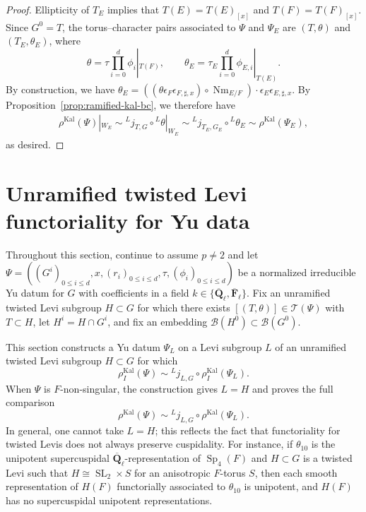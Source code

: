 \documentclass[reqno]{amsart}
\numberwithin{equation}{subsection}
\newcommand{\F}{\mathbf{F}}
\newcommand{\Q}{\mathbf{Q}}
\newcommand{\ol}[1]{\overline{#1}}
\newcommand{\ld}{{}^L}
\newcommand\cB{\mathcal{B}}
\newcommand\cT{\mathcal{T}}
\DeclareMathOperator{\SL}{SL}
\DeclareMathOperator{\Sp}{Sp}
\DeclareMathOperator{\Nm}{Nm}
\DeclareMathOperator{\Kal}{Kal}
\theoremstyle{remark}
\numberwithin{equation}{subsection}
\numberwithin{figure}{subsection}
\begin{document}
\begin{proof}
Ellipticity of $T_E$ implies that $T(E)=T(E)_{[x]}$ and $T(F)=T(F)_{[x]}$. Since $G^0=T$, the torus--character pairs associated to $\Psi$ and $\Psi_E$ are $(T,\theta)$ and $(T_E,\theta_E)$, where
\[
\theta=\tau\prod_{i=0}^d\phi_i|_{T(F)},
\qquad
\theta_E=\tau_E\prod_{i=0}^d\phi_{E,i}|_{T(E)}.
\]
By construction, we have $
\theta_E=((\theta\epsilon_F\epsilon_{F,\sharp,x})\circ \Nm_{E/F}) \cdot \epsilon_E\epsilon_{E,\sharp,x}$. By Proposition~\ref{prop:ramified-kal-bc}, we therefore have
\begin{align*}
    \rho^{\Kal}(\Psi)|_{W_E} \sim \ld j_{T,G}\circ\ld\theta|_{W_E} \sim \ld j_{T_E,G_E}\circ\ld\theta_E \sim \rho^{\Kal}(\Psi_E),
\end{align*}
as desired.
\end{proof}













\section{Unramified twisted Levi functoriality for Yu data}\label{ss:kaletha-functoriality}

Throughout this section, continue to assume $p \neq 2$ and let $\Psi = ((G^i)_{0\leq i\leq d}, x, (r_i)_{0\leq i\leq d}, \tau, (\phi_i)_{0\leq i\leq d})$ be a normalized irreducible Yu datum for $G$ with coefficients in a field $k \in \{\ol\Q_\ell,\ol\F_\ell\}$. Fix an unramified twisted Levi subgroup $H\subset G$ for which there exists $[(T, \theta)] \in \cT(\Psi)$ with $T \subset H$, let $H^i=H\cap G^i$, and fix an embedding $\cB(H^0) \subset \cB(G^0)$.

This section constructs a Yu datum $\Psi_L$ on a Levi subgroup $L$ of an unramified twisted Levi subgroup $H\subset G$ for which
\[
\rho_I^{\Kal}(\Psi)\sim \ld j_{L,G}\circ\rho_I^{\Kal}(\Psi_L).
\]
When $\Psi$ is $F$-non-singular, the construction gives $L=H$ and proves the full comparison
\[
\rho^{\Kal}(\Psi)\sim \ld j_{L,G}\circ\rho^{\Kal}(\Psi_L).
\]
In general, one cannot take $L = H$; this reflects the fact that functoriality for twisted Levis does not always preserve cuspidality. For instance, if $\theta_{10}$ is the unipotent supercuspidal $\ol\Q_\ell$-representation of $\Sp_4(F)$ and $H \subset G$ is a twisted Levi such that $H \cong \SL_2 \times S$ for an anisotropic $F$-torus $S$, then each smooth representation of $H(F)$ functorially associated to $\theta_{10}$ is unipotent, and $H(F)$ has no supercuspidal unipotent representations.
\end{document}
